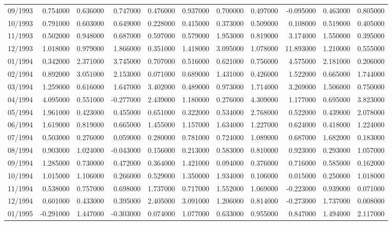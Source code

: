 \begin{tabular}{lrrrrrrrrrr}
09/1993 & 0.754000 & 0.636000 & 0.747000 & 0.476000 & 0.937000 & 0.700000 & 0.497000 & -0.095000 & 0.463000 & 0.805000 \\
10/1993 & 0.791000 & 0.603000 & 0.649000 & 0.228000 & 0.415000 & 0.373000 & 0.509000 & 0.108000 & 0.519000 & 0.405000 \\
11/1993 & 0.502000 & 0.948000 & 0.687000 & 0.597000 & 0.579000 & 1.953000 & 0.819000 & 3.174000 & 1.550000 & 0.395000 \\
12/1993 & 1.018000 & 0.979000 & 1.866000 & 0.351000 & 1.418000 & 3.095000 & 1.078000 & 11.893000 & 1.210000 & 0.555000 \\
01/1994 & 0.342000 & 2.371000 & 3.745000 & 0.707000 & 0.516000 & 0.621000 & 0.756000 & 4.575000 & 2.181000 & 0.206000 \\
02/1994 & 0.892000 & 3.051000 & 2.153000 & 0.071000 & 0.689000 & 1.431000 & 0.426000 & 1.522000 & 0.665000 & 1.744000 \\
03/1994 & 1.259000 & 0.616000 & 1.647000 & 3.402000 & 0.489000 & 0.973000 & 1.714000 & 3.269000 & 1.506000 & 0.750000 \\
04/1994 & 4.095000 & 0.551000 & -0.277000 & 2.439000 & 1.180000 & 0.276000 & 4.309000 & 1.177000 & 0.695000 & 3.823000 \\
05/1994 & 1.961000 & 0.423000 & 0.455000 & 0.651000 & 0.322000 & 0.534000 & 2.768000 & 0.522000 & 0.439000 & 2.078000 \\
06/1994 & 1.619000 & 0.819000 & 0.665000 & 1.455000 & 1.157000 & 1.634000 & 1.227000 & 0.624000 & 0.418000 & 1.224000 \\
07/1994 & 0.503000 & 0.276000 & 0.059000 & 0.280000 & 0.781000 & 0.724000 & 1.089000 & 0.687000 & 1.682000 & 0.183000 \\
08/1994 & 0.903000 & 1.024000 & -0.043000 & 0.156000 & 0.213000 & 0.583000 & 0.810000 & 0.923000 & 0.293000 & 1.057000 \\
09/1994 & 1.285000 & 0.730000 & 0.472000 & 0.364000 & 1.421000 & 0.094000 & 0.376000 & 0.716000 & 0.585000 & 0.162000 \\
10/1994 & 1.015000 & 1.106000 & 0.266000 & 0.529000 & 1.350000 & 1.934000 & 0.106000 & 0.015000 & 0.250000 & 1.018000 \\
11/1994 & 0.538000 & 0.757000 & 0.698000 & 1.737000 & 0.717000 & 1.552000 & 1.069000 & -0.223000 & 0.939000 & 0.071000 \\
12/1994 & 0.601000 & 0.433000 & 0.395000 & 2.405000 & 3.091000 & 1.206000 & 0.814000 & -0.273000 & 1.737000 & 0.008000 \\
01/1995 & -0.291000 & 1.447000 & -0.303000 & 0.074000 & 1.077000 & 0.633000 & 0.955000 & 0.847000 & 1.494000 & 2.117000 \\

\end{tabular}
